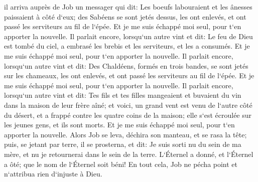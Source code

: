 \verse il arriva auprès de Job un messager qui dit: Les boeufs labouraient et les ânesses paissaient à côté d`eux; 
\verse des Sabéens se sont jetés dessus, les ont enlevés, et ont passé les serviteurs au fil de l`épée. Et je me suis échappé moi seul, pour t`en apporter la nouvelle. 
\verse Il parlait encore, lorsqu`un autre vint et dit: Le feu de Dieu est tombé du ciel, a embrasé les brebis et les serviteurs, et les a consumés. Et je me suis échappé moi seul, pour t`en apporter la nouvelle. 
\verse Il parlait encore, lorsqu`un autre vint et dit: Des Chaldéens, formés en trois bandes, se sont jetés sur les chameaux, les ont enlevés, et ont passé les serviteurs au fil de l`épée. Et je me suis échappé moi seul, pour t`en apporter la nouvelle. 
\verse Il parlait encore, lorsqu`un autre vint et dit: Tes fils et tes filles mangeaient et buvaient du vin dans la maison de leur frère aîné; 
\verse et voici, un grand vent est venu de l`autre côté du désert, et a frappé contre les quatre coins de la maison; elle s`est écroulée sur les jeunes gens, et ils sont morts. Et je me suis échappé moi seul, pour t`en apporter la nouvelle. 
\verse Alors Job se leva, déchira son manteau, et se rasa la tête; puis, se jetant par terre, il se prosterna, 
\verse et dit: Je suis sorti nu du sein de ma mère, et nu je retournerai dans le sein de la terre. L`Éternel a donné, et l`Éternel a ôté; que le nom de l`Éternel soit béni! 
\verse En tout cela, Job ne pécha point et n`attribua rien d`injuste à Dieu. 

